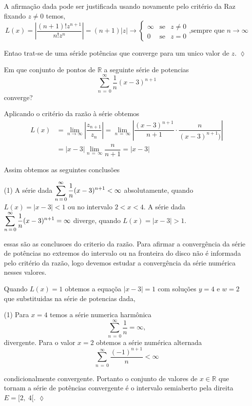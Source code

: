\solo
A afirmação dada pode ser justificada usando novamente pelo crit\'{e}rio da Raz\ao\, fixando
$z\neq 0$ temos,
\begin{equation*}
L(x)=\left|\frac{(n+1)!z^{n+1}}{n!z^n}\right|=(n+1)|z| \to 
\left\{
\begin{array}{ccc}
\infty& \text{se} & z \neq 0\\[2ex]
0 & \text{se} &  z=0
\end{array}
\right.
\text{,sempre que }
  n\to \infty
\end{equation*}

Entao trat-se de uma séride potências que converge para um unico valor de \(z\). \hfill 
\(\lozenge\)

\begin{exer}
Em que conjunto de pontos  de \(\mathbb{R}\)  a seguinte série de potencias 
\begin{equation*}
\sum_{n\, =\, 0}^{\infty}\dfrac{1}{n}(x-3)^{n+1}
\end{equation*}
converge?
\end{exer}

\solo
Aplicando o critério da razão à série obtemos
\begin{align*}
  L(x) &=\lim_{n \to \infty}\left|\dfrac{z_{n+1}}{z_{n}}\right|=\lim_{n\,=\, \infty}
  \left|\dfrac{(x-3)^{n+1}}{n+1}\cdot \dfrac{n}{(x-3)^{n+1})}\right|\\[2ex]
&= \left|x-3\right|\lim_{n\,=\,\infty}\dfrac{n}{n+1}=\left|x-3\right|
\end{align*}

Assim obtemos as seguintes conclusões
\begin{tasks}[label=(\alph*),label-width=4ex,item-indent=3em,ref=(\alph*)](1)
 \task A série dada \(\displaystyle \sum_{n\, =\, 0}^{\infty}\dfrac{1}{n}(x-3)^{n+1} < \infty\) absolutamente, quando 
 \(L(x)=|x-3|<1\) ou no intervalo \(2 < x < 4\).
 \task A série dada \(\displaystyle \sum_{n\, =\, 0}^{\infty}\dfrac{1}{n}(x-3)^{n+1} = \infty\) diverge,
 quando \(L(x)=|x-3|>1\).
\end{tasks}
essas são as conclusoes do criterio da razão. Para afirmar a convergência da série de potências 
no extremos do intervalo ou na fronteira do disco não é informada pelo critério da razão, logo 
devemos estudar a convergência da série numérica nesses valores.

Quando \(L(x)=1\) obtemos a equaçõa \(|x-3|=1\) com soluções \(y=4\) e \(w=2\) que substituidas na série 
de potencias dada,
\begin{tasks}[label=(\alph*),label-width=4ex,item-indent=3em,ref=(\alph*)](1)
\task  Para \(x=4\) temos a série numerica harmônica
\begin{equation*}
\sum_{n\,=\,0}^{\infty}\dfrac{1}{n} =\infty,
\end{equation*}
divergente.
\task Para o valor \(x=2\) obtemos a série numérica alternada
\begin{equation*}
\sum_{n\,=\,0}^{\infty}\dfrac{(-1)^{n+1}}{n} <\infty
\end{equation*}
\end{tasks}
condicionalmente convergente. Portanto o conjunto de valores de \(x \in \mathbb{R}\) que tornam a série de potências 
convergente é o intervalo semiaberto pela direita \(E=[2,\; 4[\). \hfill \(\lozenge\)


